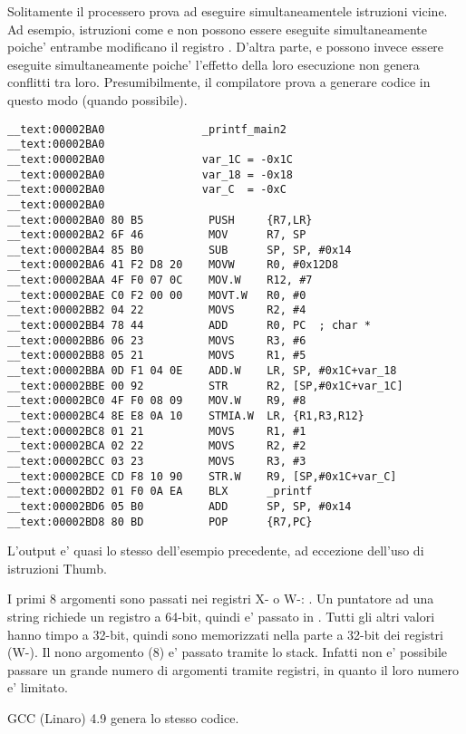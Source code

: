 Solitamente il processero prova ad eseguire simultaneamentele istruzioni vicine.
Ad esempio, istruzioni come  e
 non possono essere eseguite simultaneamente poiche' entrambe modificano il registro . 
D'altra parte,  e  
possono invece essere eseguite simultaneamente poiche' l'effetto della loro esecuzione non genera conflitti tra loro.
Presumibilmente, il compilatore prova a generare codice in questo modo (quando possibile).
 
\myparagraph{\OptimizingXcodeIV: \ThumbTwoMode}

\begin{lstlisting}[style=customasmARM]
__text:00002BA0               _printf_main2
__text:00002BA0
__text:00002BA0               var_1C = -0x1C
__text:00002BA0               var_18 = -0x18
__text:00002BA0               var_C  = -0xC
__text:00002BA0
__text:00002BA0 80 B5          PUSH     {R7,LR}
__text:00002BA2 6F 46          MOV      R7, SP
__text:00002BA4 85 B0          SUB      SP, SP, #0x14
__text:00002BA6 41 F2 D8 20    MOVW     R0, #0x12D8
__text:00002BAA 4F F0 07 0C    MOV.W    R12, #7
__text:00002BAE C0 F2 00 00    MOVT.W   R0, #0
__text:00002BB2 04 22          MOVS     R2, #4
__text:00002BB4 78 44          ADD      R0, PC  ; char *
__text:00002BB6 06 23          MOVS     R3, #6
__text:00002BB8 05 21          MOVS     R1, #5
__text:00002BBA 0D F1 04 0E    ADD.W    LR, SP, #0x1C+var_18
__text:00002BBE 00 92          STR      R2, [SP,#0x1C+var_1C]
__text:00002BC0 4F F0 08 09    MOV.W    R9, #8
__text:00002BC4 8E E8 0A 10    STMIA.W  LR, {R1,R3,R12}
__text:00002BC8 01 21          MOVS     R1, #1
__text:00002BCA 02 22          MOVS     R2, #2
__text:00002BCC 03 23          MOVS     R3, #3
__text:00002BCE CD F8 10 90    STR.W    R9, [SP,#0x1C+var_C]
__text:00002BD2 01 F0 0A EA    BLX      _printf
__text:00002BD6 05 B0          ADD      SP, SP, #0x14
__text:00002BD8 80 BD          POP      {R7,PC}
\end{lstlisting}

L'output e' quasi lo stesso dell'esempio precedente, ad eccezione dell'uso di istruzioni Thumb. 





I primi 8 argomenti sono passati nei registri X- o W-: \ARMPCS.
Un puntatore ad una string richiede un registro a 64-bit, quindi e' passato in .
Tutti gli altri valori hanno timpo \Tint a 32-bit, quindi sono memorizzati nella parte a 32-bit dei registri (W-).
Il nono argomento (8) e' passato tramite lo stack.
Infatti non e' possibile passare un grande numero di argomenti tramite registri, in quanto il loro numero e' limitato.

\Optimizing GCC (Linaro) 4.9 genera lo stesso codice.
